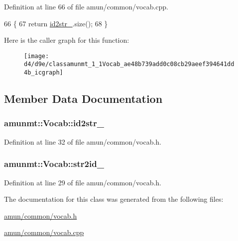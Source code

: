 Definition at line 66 of file amun/common/vocab.\+cpp.


\begin{DoxyCode}
66                          \{
67   \textcolor{keywordflow}{return} \hyperlink{classamunmt_1_1Vocab_a1eb74fdcd40400033cd54de1b6479a46}{id2str\_}.size();
68 \}
\end{DoxyCode}


Here is the caller graph for this function\+:
\nopagebreak
\begin{figure}[H]
\begin{center}
\leavevmode
\texttt{[image: d4/d9e/classamunmt\_1\_1Vocab\_ae48b739add0c08cb29aeef394641dd4b\_icgraph]}
\end{center}
\end{figure}




\subsection{Member Data Documentation}
\subsubsection[{\texorpdfstring{id2str\+\_\+}{id2str_}}]{ amunmt\+::\+Vocab\+::id2str\+\_\+\hspace{0.3cm}{\ttfamily [private]}}\hypertarget{classamunmt_1_1Vocab_a1eb74fdcd40400033cd54de1b6479a46}{}\label{classamunmt_1_1Vocab_a1eb74fdcd40400033cd54de1b6479a46}


Definition at line 32 of file amun/common/vocab.\+h.

\subsubsection[{\texorpdfstring{str2id\+\_\+}{str2id_}}]{ amunmt\+::\+Vocab\+::str2id\+\_\+\hspace{0.3cm}{\ttfamily [private]}}\hypertarget{classamunmt_1_1Vocab_a65742057ec048992dcc4ddca523b572f}{}\label{classamunmt_1_1Vocab_a65742057ec048992dcc4ddca523b572f}


Definition at line 29 of file amun/common/vocab.\+h.



The documentation for this class was generated from the following files\+:\begin{DoxyCompactItemize}
\item 
\hyperlink{amun_2common_2vocab_8h}{amun/common/vocab.\+h}\item 
\hyperlink{amun_2common_2vocab_8cpp}{amun/common/vocab.\+cpp}\end{DoxyCompactItemize}

